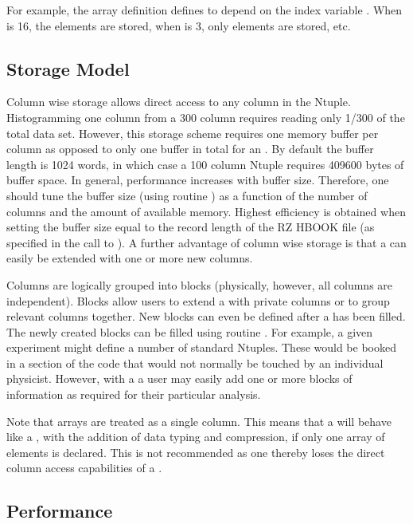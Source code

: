 For example, the array definition  
defines  to depend on the index variable . 
When  is 16, the elements  are stored, 
when  is 3, only elements  are stored, etc.

\subsection*{Storage Model}

Column wise storage allows direct access to any column in the Ntuple. 
Histogramming one column from a 300 column \CWN{} requires reading 
only 1/300 of the total data set. 
However, this storage scheme requires one memory buffer per column 
as opposed to only one buffer in total for an \RWN.
By default the buffer length is 1024 words, 
in which case a 100 column Ntuple requires 409600 bytes of buffer space. 
In general, performance increases with buffer size.
Therefore, one should tune the buffer size (using routine ) 
as a function of the number of columns and the amount of available memory.
Highest efficiency is obtained when setting the buffer size equal to the
record length of the RZ HBOOK file (as specified in the call to
). 
A further advantage of column wise storage is that a \CWN{}
can easily be extended with one or more new columns.

Columns are logically grouped into blocks (physically, however, all
columns are independent). 
Blocks allow users to extend a \CWN{} with private columns or to 
group relevant columns together.
New blocks can even be defined after a \CWN{} has been filled. 
The newly created blocks can be filled using routine .
For example, a given experiment might define a number of standard
Ntuples. These would be booked in a section of the code that
would not normally be touched by an individual physicist. However,
with a \CWN{} a user may easily add one or more blocks of information
as required for their particular analysis.

Note that arrays are treated as a single column. 
This means that a \CWN{} will behave like a \RWN{},
with the addition of data typing and compression,
if only one array of  elements is declared.
This is not recommended as one thereby loses
the direct column access capabilities of a \CWN{}.

\subsection*{Performance}

